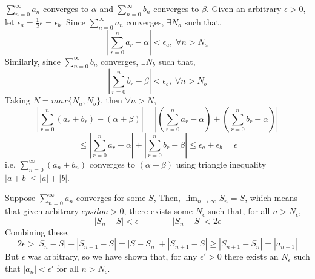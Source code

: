 {\(\sum^\infty_{n=0}a_n\) converges to \(\alpha\) and \(\sum^\infty_{n=0}b_n\) converges to \(\beta\). Given an arbitrary \(\epsilon > 0\), let \(\epsilon_a = \frac{1}{2}\epsilon = \epsilon_b\). Since \(\sum^\infty_{n=0}a_n\) converges, \(\exists N_a\) such that,
\begin{equation}
    \left|\sum_{r=0}^{n}a_r - \alpha\right| < \epsilon_a,\;\forall n > N_a
\end{equation}
Similarly, since \(\sum^\infty_{n=0}b_n\) converges, \(\exists N_b\) such that,
\begin{equation}
    \left|\sum_{r=0}^{n}b_r - \beta\right| < \epsilon_b,\;\forall n > N_b
\end{equation}
\newpage\noindent Taking \(N = max\{N_a,N_b\}\), then \(\forall n > N\), 
\begin{equation}
    \left|\sum_{r=0}^{n}(a_r + b_r) - (\alpha + \beta)\right| = \left|\left(\sum_{r=0}^{n}a_r - \alpha\right) + \left(\sum_{r=0}^{n}b_r - \alpha\right)\right|
\end{equation}
\begin{equation*}
    \leq \left|\sum_{r=0}^{n}a_r - \alpha\right| + \left|\sum_{r=0}^{n}b_r - \beta\right| \leq \epsilon_a + \epsilon_b = \epsilon
\end{equation*}
i.e, \(\sum^\infty_{n=0}(a_n + b_n)\) converges to \((\alpha + \beta)\) using triangle inequality \(|a+b| \leq |a| + |b|\).
}

{Suppose \(\sum_{n=0}^{\infty}a_n\) converges for some \(S\), Then, \(\lim_{n\rightarrow\infty}S_n = S\), which means that given arbitrary \(epsilon > 0\), there exists some \(N_\epsilon\) such that, for all \(n > N_\epsilon\),
\begin{equation}
    |S_n - S| < \epsilon \qquad\qquad |S_n - S| < 2\epsilon
\end{equation}
Combining these, 
\begin{equation}
    2\epsilon > |S_n - S| + |S_{n+1} - S| = |S - S_n| + |S_{n+1} - S| \geq |S_{n+1} - S_n| = |a_{n+1}|
\end{equation}
But \(\epsilon\) was arbitrary, so we have shown that, for any \(\epsilon' > 0\) there exists an \(N_\epsilon\) such that \(|a_n| < \epsilon'\) for all \(n > N_\epsilon\). }

